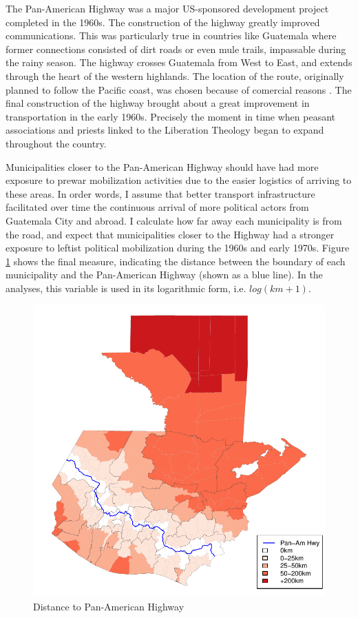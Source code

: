 \documentclass[12pt, notitlepage]{article}
\begin{document}
The Pan-American Highway was a major US-sponsored development project completed in the 1960s.
The construction of the highway greatly improved communications.
This was particularly true in countries like Guatemala where former connections consisted of dirt roads or even mule trails, impassable during the rainy season.
The highway crosses Guatemala from West to East, and extends through the heart of the western highlands.
The location of the route, originally planned to follow the Pacific coast, was chosen because of comercial reasons \citep{Rutkow:2019aa}.
The final construction of the highway brought about a great improvement in transportation in the early 1960s.
Precisely the moment in time when peasant associations and priests linked to the Liberation Theology began to expand throughout the country.

Municipalities closer to the Pan-American Highway should have had more exposure to prewar mobilization activities due to the easier logistics of arriving to these areas.
In order words, I assume that better transport infrastructure facilitated over time the continuous arrival of more political actors from Guatemala City and abroad.
I calculate how far away each municipality is from the road, and expect that municipalities closer to the Highway had a stronger exposure to leftist political mobilization during the 1960s and early 1970s.
Figure \ref{fig:map_panam} shows the final measure, indicating the distance between the boundary of each municipality and the Pan-American Highway (shown as a blue line). In the analyses, this variable is used in its logarithmic form, i.e. $log(km + 1)$.

\begin{figure}[htb!]
  \centering
    \includegraphics[width = .4\textwidth]{img/map_panam}

  \caption{Distance to Pan-American Highway} \label{fig:map_panam}

\end{figure}
\end{document}
